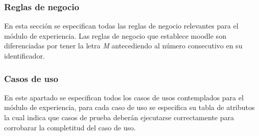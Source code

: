 

%
\subsubsection{Reglas de negocio} %

 En esta sección se especifican todas las reglas de negocio relevantes para el módulo de
 experiencia. Las reglas de negocio que establece moodle son diferenciadas por tener la letra {\it M}
 antecediendo al número consecutivo en su identificador.



\clearpage
\subsubsection{Casos de uso} %

 En este apartado se especifican todos los casos de usos contemplados para el módulo de
 experiencia, para cada caso de uso se especifica su tabla de atributos la cual indica que casos
 de prueba deberán ejecutarse correctamente para corrobarar la completitud del caso de uso.


